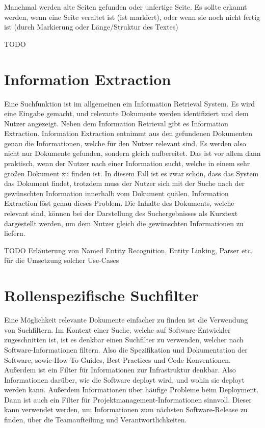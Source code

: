 Manchmal werden alte Seiten gefunden oder unfertige Seite.
Es sollte erkannt werden, wenn eine Seite veraltet ist (ist markiert), oder wenn sie noch nicht fertig ist (durch Markierung oder Länge/Struktur des Textes)

TODO

\section{Information Extraction}

Eine Suchfunktion ist im allgemeinen ein Information Retrieval System.
Es wird eine Eingabe gemacht, und relevante Dokumente werden identifiziert und dem Nutzer angezeigt.
Neben dem Information Retrieval gibt es Information Extraction.
Information Extraction entnimmt aus den gefundenen Dokumenten genau die Informationen, welche für den Nutzer relevant sind.
Es werden also nicht nur Dokumente gefunden, sondern gleich aufbereitet.
Das ist vor allem dann praktisch, wenn der Nutzer nach einer Information sucht, welche in einem sehr großen Dokument zu finden ist.
In diesem Fall ist es zwar schön, dass das System das Dokument findet, trotzdem muss der Nutzer sich mit der Suche nach der gewünschten Information innerhalb vom Dokument quälen.
Information Extraction löst genau dieses Problem.
Die Inhalte des Dokuments, welche relevant sind, können bei der Darstellung des Suchergebnisses als Kurztext dargestellt werden, um dem Nutzer gleich die gewünschten Informationen zu liefern.

TODO Erläuterung von Named Entity Recognition, Entity Linking, Parser etc. für die Umsetzung solcher Use-Cases

\section{Rollenspezifische Suchfilter}

Eine Möglichkeit relevante Dokumente einfacher zu finden ist die Verwendung von Suchfiltern.
Im Kontext einer Suche, welche auf Software-Entwickler zugeschnitten ist, ist es denkbar einen Suchfilter zu verwenden, welcher nach Software-Informationen filtern.
Also die Spezifikation und Dokumentation der Software, sowie How-To-Guides, Best-Practices und Code Konventionen.
Außerdem ist ein Filter für Informationen zur Infrastruktur denkbar. Also Informationen darüber, wie die Software deployt wird, und wohin sie deployt werden kann.
Außerdem Informationen über häufige Probleme beim Deployment.
Dann ist auch ein Filter für Projektmanagement-Informationen sinnvoll.
Dieser kann verwendet werden, um Informationen zum nächsten Software-Release zu finden, über die Teamaufteilung und Verantwortlichkeiten.